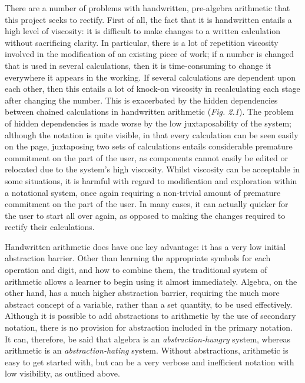 \documentclass[12pt,twoside,notitlepage,xetex]{report}
\begin{document}
There are a number of problems with handwritten, pre-algebra arithmetic that
this project seeks to rectify.  First of all, the fact that it is handwritten
entails a high level of viscosity: it is difficult to make changes to a written
calculation without sacrificing clarity.  In particular, there is a lot of
repetition viscosity involved in the modification of an existing piece of work;
if a number is changed that is used in several calculations, then it is
time-consuming to change it everywhere it appears in the working.  If several
calculations are dependent upon each other, then this entails a lot of knock-on
viscosity in recalculating each stage after changing the number.  This is
exacerbated by the hidden dependencies between chained calculations in
handwritten arithmetic (\emph{Fig. 2.1}).  The problem of hidden dependencies
is made worse by the low juxtaposability of the system; although the notation
is quite visible, in that every calculation can be seen easily on the page,
juxtaposing two sets of calculations entails considerable premature commitment
on the part of the user, as components cannot easily be edited or relocated due
to the system's high viscosity.  Whilst viscosity can be acceptable in some
situations, it is harmful with regard to modification and exploration within a
notational system, once again requiring a non-trivial amount of premature
commitment on the part of the user.  In many cases, it can actually quicker for
the user to start all over again, as opposed to making the changes required to
rectify their calculations.

Handwritten arithmetic does have one key advantage: it has a very low initial
abstraction barrier.  Other than learning the appropriate symbols for each
operation and digit, and how to combine them, the traditional system of
arithmetic allows a learner to begin using it almost immediately.  Algebra, on
the other hand, has a much higher abstraction barrier, requiring the much more
abstract concept of a variable, rather than a set quantity, to be used
effectively.  Although it is possible to add abstractions to arithmetic by the
use of secondary notation, there is no provision for abstraction included in
the primary notation.  It can, therefore, be said that algebra is an
\emph{abstraction-hungry} system, whereas arithmetic is an
\emph{abstraction-hating} system.  Without abstractions, arithmetic is easy to
get started with, but can be a very verbose and inefficient notation with low
visibility, as outlined above.
\end{document}
